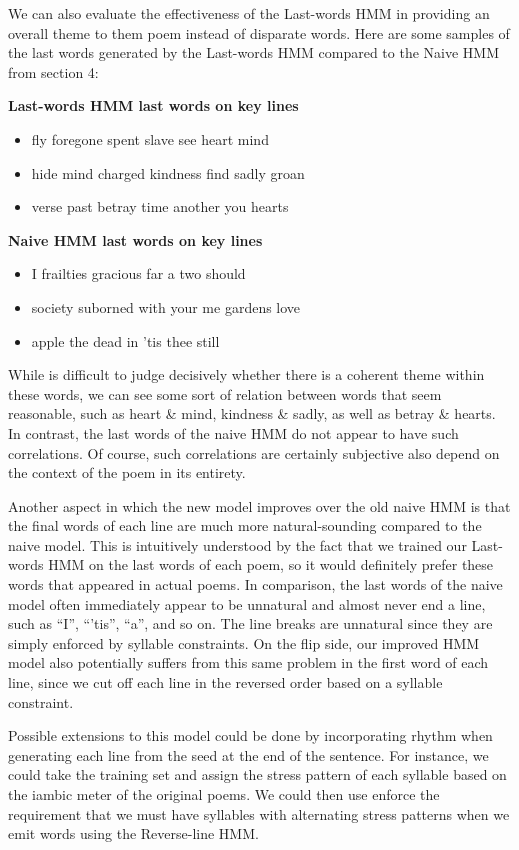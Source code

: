We can also evaluate the effectiveness of the Last-words HMM in providing an overall theme to them poem instead of disparate words. Here are some samples of the last words generated by the Last-words HMM compared to the Naive HMM from section 4:

\textbf{Last-words HMM last words on key lines}
\begin{itemize}
    \item fly foregone spent slave see heart mind
    \item hide mind charged kindness find sadly groan
    \item verse past betray time another you hearts
\end{itemize}

\textbf{Naive HMM last words on key lines}
\begin{itemize}
    \item I frailties gracious far a two should
    \item society suborned with your me gardens love
    \item apple the dead in 'tis thee still
\end{itemize}

While is difficult to judge decisively whether there is a coherent theme within these words, we can see some sort of relation between words that seem reasonable, such as heart \& mind, kindness \& sadly, as well as betray \& hearts. In contrast, the last words of the naive HMM do not appear to have such correlations. Of course, such correlations are certainly subjective also depend on the context of the poem in its entirety. 

Another aspect in which the new model improves over the old naive HMM is that the final words of each line are much more natural-sounding compared to the naive model. This is intuitively understood by the fact that we trained our Last-words HMM on the last words of each poem, so it would definitely prefer these words that appeared in actual poems. In comparison, the last words of the naive model often immediately appear to be unnatural and almost never end a line, such as ``I'', ``'tis'', ``a'', and so on. The line breaks are unnatural since they are simply enforced by syllable constraints. On the flip side, our improved HMM model also potentially suffers from this same problem in the first word of each line, since we cut off each line in the reversed order based on a syllable constraint.

Possible extensions to this model could be done by incorporating rhythm when generating each line from the seed at the end of the sentence. For instance, we could take the training set and assign the stress pattern of each syllable based on the iambic meter of the original poems. We could then use enforce the requirement that we must have syllables with alternating stress patterns when we emit words using the Reverse-line HMM. 

